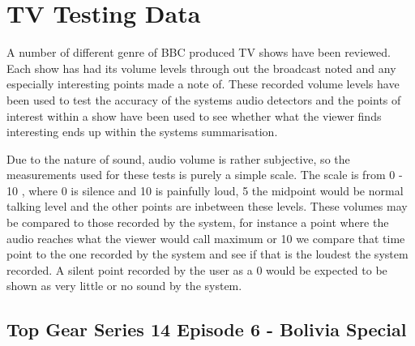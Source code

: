 \newpage
\section{TV Testing Data}
\label{sec:TV}

A number of different genre of BBC produced TV shows have been reviewed. Each
show has had its volume levels through out the broadcast noted and any
especially interesting points made a note of. These
recorded volume levels have been used to test the accuracy of the systems audio detectors and the points of
interest within a show have been used to see whether what the viewer finds
interesting ends up within the systems summarisation. 

Due to the nature of sound, audio volume is rather subjective, so the
measurements used for these tests is purely a simple scale. The scale is from 0
- 10 , where 0 is silence and 10 is painfully loud, 5 the midpoint would be
normal talking level and the other points are inbetween these levels. These
volumes may be compared to those recorded by the system, for instance a point
where the audio reaches what the viewer would call maximum or 10 we compare that
time point to the one recorded by the system and see if that is the loudest
the system recorded. A silent point recorded by the user as a 0 would be expected to
be shown as very little or no sound by the system. 

\subsection{Top Gear Series 14 Episode 6 - Bolivia Special}

